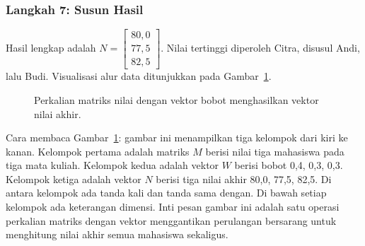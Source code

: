 \documentclass[11pt,a4paper]{article}
\begin{document}
\subsubsection{Langkah 7: Susun Hasil}

Hasil lengkap adalah $N=\begin{bmatrix}80{,}0\\77{,}5\\82{,}5\end{bmatrix}$. Nilai tertinggi diperoleh Citra, disusul Andi, lalu Budi. Visualisasi alur data ditunjukkan pada Gambar~\ref{fig:nilai-akhir}.

\begin{figure}[H]
	\centering
	\caption{Perkalian matriks nilai dengan vektor bobot menghasilkan vektor nilai akhir.}
	\label{fig:nilai-akhir}
\end{figure}

Cara membaca Gambar~\ref{fig:nilai-akhir}: gambar ini menampilkan tiga kelompok dari kiri ke kanan. Kelompok pertama adalah matriks $M$ berisi nilai tiga mahasiswa pada tiga mata kuliah. Kelompok kedua adalah vektor $W$ berisi bobot 0,4, 0,3, 0,3. Kelompok ketiga adalah vektor $N$ berisi tiga nilai akhir 80,0, 77,5, 82,5. Di antara kelompok ada tanda kali dan tanda sama dengan. Di bawah setiap kelompok ada keterangan dimensi. Inti pesan gambar ini adalah satu operasi perkalian matriks dengan vektor menggantikan perulangan bersarang untuk menghitung nilai akhir semua mahasiswa sekaligus.
\end{document}
